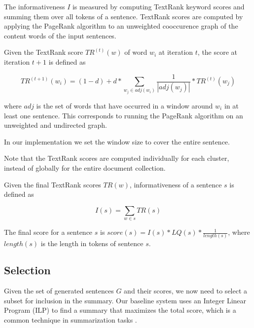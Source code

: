 \documentclass[a4paper,BCOR=10mm]{report}
\numberwithin{lemma}{chapter}
\numberwithin{definition}{chapter}
\begin{document}
The informativeness $I$ is measured by computing TextRank \citep{textrank} keyword scores and summing them over all tokens of a sentence.
TextRank scores are computed by applying the PageRank \citep{pagerank} algorithm to an unweighted cooccurence graph of the content words of the input sentences.

Given the TextRank score $TR^{(t)}(w)$ of word $w_i$ at iteration $t$, the score at iteration $t + 1$ is defined as

\begin{equation}
TR^{(t + 1)}(w_i) = (1 - d) + d * \sum_{w_j \in \mathit{adj}(w_i)} \frac{1}{|\mathit{adj}(w_j)|} * TR^{(t)}(w_j)
\end{equation}

where $\mathit{adj}$ is the set of words that have occurred in a window around $w_i$ in at least one sentence.
This corresponds to running the PageRank algorithm on an unweighted and undirected graph.

In our implementation we set the window size to cover the entire sentence.

Note that the TextRank scores are computed individually for each cluster, instead of globally for the entire document collection.

Given the final TextRank scores $TR(w)$, informativeness of a sentence $s$ is defined as

\begin{equation}
    I(s) = \sum_{w \in s} TR(s)
\end{equation}

The final score for a sentence $s$ is $\mathit{score}(s) = I(s) * LQ(s) * \frac{1}{\mathit{length}(s)}$, where $\mathit{length}(s)$ is the length in tokens of sentence $s$. %


\subsection{Selection} \label{sec:baseline-selection}

Given the set of generated sentences $G$ and their scores, we now need to select a subset for inclusion in the summary.
Our baseline system uses an Integer Linear Program (ILP) to find a summary that maximizes the total score, which is a common technique in summarization tasks \citep{recent-advances}. %
\end{document}
